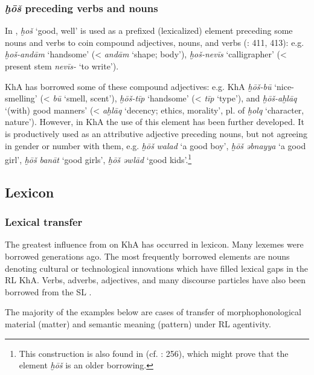 \documentclass[output=paper,nonflat]{langsci/langscibook}
\begin{document}
\subsubsection{\textit{ḫōš} preceding verbs and nouns} \label{xosh}

In , \textit{ḫoš} ‘good, well’ is used as a prefixed (lexicalized) element preceding some nouns and verbs to coin compound adjectives, nouns, and verbs (\citealt{Majidi1990}: 411, 413): e.g.  \textit{ḫoš-andām} ‘handsome’ (< \textit{andām} ‘shape; body’), \textit{ḫoš-nevīs} ‘calligrapher’ (< present {stem} \textit{nevīs-} ‘to write’).

KhA has borrowed some of these  compound adjectives: e.g. KhA \textit{ḫōš-bū} ‘nice-smelling’ (<  \textit{bū} ‘smell, scent’), \textit{ḫōš-tīp} ‘handsome’ (<  \textit{tīp} ‘type’), and \textit{ḫōš-aḫlāq} ‘(with) good manners’ (<  \textit{aḫlāq} ‘decency; ethics, morality’, pl. of \textit{ḫolq} ‘character, nature’). However, in KhA the use of this element has been further developed. It is productively used as an attributive adjective preceding nouns, but not agreeing in {gender} or number with them, e.g. \textit{ḫōš} \textit{walad} ‘a good boy’, \textit{ḫōš} \textit{əbnayya} ‘a good girl’, \textit{ḫōš} \textit{banāt} ‘good girls’, \textit{ḫōš} \textit{əwlād} ‘good kids’.\footnote{This construction is also found in   (cf. \citealt{Erwin1963}: 256), which might prove that the element \textit{ḫōš} is an older borrowing.}



\subsection{Lexicon}
\subsubsection{Lexical transfer}

The greatest influence from  on KhA has occurred in lexicon. Many  lexemes were borrowed generations ago. The most frequently borrowed elements are nouns denoting cultural or technological innovations which have filled lexical gaps in the {RL} KhA. Verbs, adverbs, adjectives, and many discourse particles have also been borrowed from the {SL} .

The majority of the examples below are cases of {transfer} of morphophonological material (matter) and semantic meaning (pattern) under {RL} agentivity. 
\end{document}
